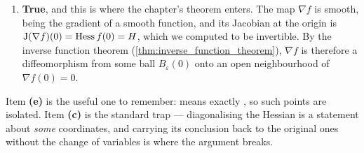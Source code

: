 \begin{exercisesolution}
\begin{enumerate}[label=\textbf{(\alph*)}]
    right-hand side of \eqref{eq:hessian_gradient_diffeomorphism_taylor} is bounded by a constant times
    $\lvert x\rvert^2$ near $0$. Vanishing to first order at a point is precisely what $O(\lvert
    x\rvert^2)$ records.
  \item \textbf{True}, and this is where the chapter's theorem enters. The map $\nabla f$ is smooth,
    being the gradient of a smooth function, and its Jacobian at the origin is
    $\operatorname{J}(\nabla f)(0) = \operatorname{Hess} f(0) = H$, which we computed to be invertible. By the inverse function
    theorem (\cref{thm:inverse_function_theorem}), $\nabla f$ is therefore a diffeomorphism from some
    ball $B_\varepsilon(0)$ onto an open neighbourhood of $\nabla f(0) = 0$.
\end{enumerate}
\begin{remark}
Item \textbf{(e)} is the useful one to remember:  means exactly
, so such points are isolated. Item \textbf{(c)} is
the standard trap --- diagonalising the Hessian is a statement about \emph{some} coordinates, and
carrying its conclusion back to the original ones without the change of variables is where the
argument breaks.
\end{remark}
\end{exercisesolution}

